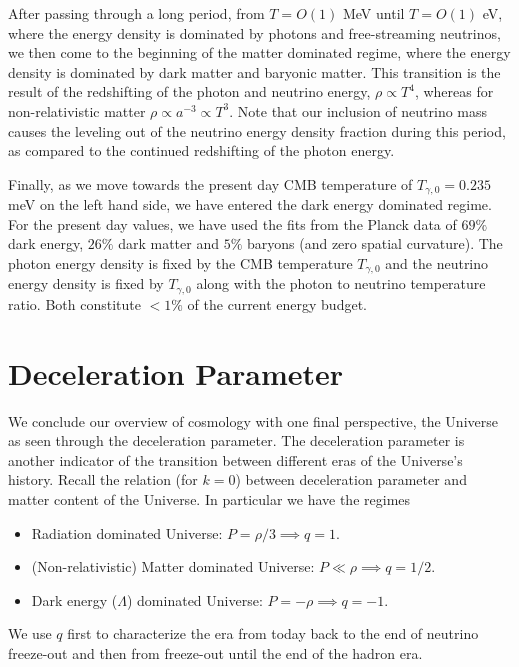 After passing through a long period, from $T=O(1)$ MeV until $T=O(1)$ eV, where the energy density is dominated by photons and free-streaming neutrinos, we then come to the beginning of the matter dominated regime, where the energy density is dominated by dark matter and baryonic matter.  This transition is the result of the redshifting of the photon and neutrino energy, $\rho\propto T^4$, whereas for non-relativistic matter $\rho\propto a^{-3}\propto T^3$.  Note that our inclusion of neutrino mass causes the leveling out of the neutrino energy density fraction during this period, as compared to the continued redshifting of the photon energy.

Finally, as we move towards the present day CMB temperature of $T_{\gamma,0}=0.235$ meV on the left hand side, we have entered the dark energy dominated regime.  For the present day values, we have used the fits from the Planck data \cite{Planck} of  $69\%$ dark energy, $26\%$ dark matter and $5\%$ baryons (and zero spatial curvature).  The photon energy density is fixed by the CMB temperature $T_{\gamma,0}$ and the neutrino energy density is fixed by $T_{\gamma,0}$ along with the photon to neutrino temperature ratio.  Both constitute $<1\%$ of the current energy budget.


\section{Deceleration Parameter}
We conclude our overview of cosmology with one final perspective, the Universe as seen through the deceleration parameter.  The deceleration parameter is another indicator of the transition between different eras of the Universe's history.  Recall the relation  (for $k=0$)  between deceleration parameter and matter content of the Universe. In particular we have the regimes

\begin{itemize}
\item Radiation dominated Universe: $P=\rho/3 \implies q=1$.\\


\item  (Non-relativistic) Matter dominated Universe: $P\ll\rho \implies q=1/2$.\\



\item Dark energy ($\Lambda$) dominated Universe: $P=-\rho \implies q=-1$.\\

\end{itemize}
We use $q$ first to characterize the era from today back to the end of neutrino freeze-out and then from freeze-out until the end of the hadron era.


